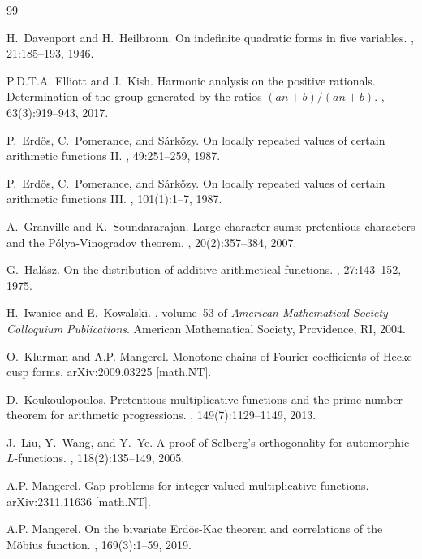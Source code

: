\begin{thebibliography}{99}

H.~Davenport and H.~Heilbronn.
\newblock On indefinite quadratic forms in five variables.
, 21:185--193, 1946.

P.D.T.A. Elliott and J.~Kish.
\newblock Harmonic analysis on the positive rationals. {D}etermination of the
  group generated by the ratios $(an+b)/(an+b)$.
, 63(3):919--943, 2017.

P.~Erd\H{o}s, C.~Pomerance, and S\'{a}rk\H{o}zy.
\newblock On locally repeated values of certain arithmetic functions {II}.
, 49:251--259, 1987.

P.~Erd\H{o}s, C.~Pomerance, and S\'{a}rk\H{o}zy.
\newblock On locally repeated values of certain arithmetic functions {III}.
, 101(1):1--7, 1987.

A.~Granville and K.~Soundararajan.
\newblock Large character sums: pretentious characters and the
  {P}\'{o}lya-{V}inogradov theorem.
, 20(2):357--384, 2007.

G.~Hal\'{a}sz.
\newblock On the distribution of additive arithmetical functions.
, 27:143--152, 1975.

H.~Iwaniec and E.~Kowalski.
, volume~53 of {\em American Mathematical
  Society Colloquium Publications}.
\newblock American Mathematical Society, Providence, RI, 2004.

O.~Klurman and A.P. Mangerel.
\newblock Monotone chains of {F}ourier coefficients of {H}ecke cusp forms.
\newblock arXiv:2009.03225 [math.NT].

D.~Koukoulopoulos.
\newblock Pretentious multiplicative functions and the prime number theorem for
  arithmetic progressions.
, 149(7):1129--1149, 2013.

J.~Liu, Y.~Wang, and Y.~Ye.
\newblock A proof of {S}elberg's orthogonality for automorphic {$L$}-functions.
, 118(2):135--149, 2005.

A.P. Mangerel.
\newblock Gap problems for integer-valued multiplicative functions.
\newblock arXiv:2311.11636 [math.NT].

A.P. Mangerel.
\newblock On the bivariate {E}rd\"{o}s-{K}ac theorem and correlations of the
  {M}\"{o}bius function.
, 169(3):1--59, 2019.


\end{thebibliography}
